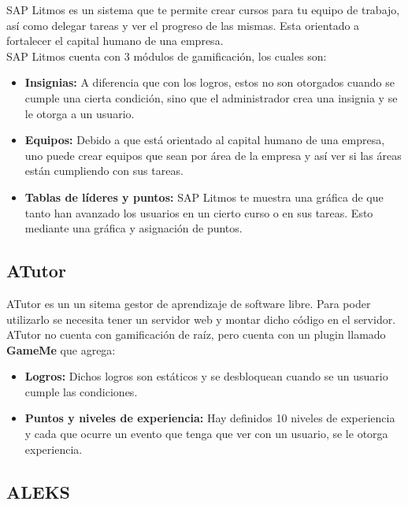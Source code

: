 \begin{multicols}{2}
    SAP Litmos es un sistema que te permite crear cursos para tu equipo de trabajo, así como delegar tareas y ver el progreso de las mismas. Esta orientado a fortalecer el capital humano de una empresa.\\
    
    \noindent SAP Litmos cuenta con 3 módulos de gamificación, los cuales son:
    \begin{itemize}
        \item \textbf{Insignias: } A diferencia que con los logros, estos no son otorgados cuando se cumple una cierta condición, sino que el administrador crea una insignia y se le otorga a un usuario.
        \item \textbf{Equipos: } Debido a que está orientado al capital humano de una empresa, uno puede crear equipos que sean por área de la empresa y así ver si las áreas están cumpliendo con sus tareas.
        \item \textbf{Tablas de líderes y puntos: } SAP Litmos te muestra una gráfica de que tanto han avanzado los usuarios en un cierto curso o en sus tareas. Esto mediante una gráfica y asignación de puntos.
    \end{itemize}

\subsection*{ATutor}

    ATutor es un un sitema gestor de aprendizaje de software libre. Para poder utilizarlo se necesita tener un servidor web y montar dicho código en el servidor.\\
    
    \noindent ATutor no cuenta con gamificación de raíz, pero cuenta con un plugin llamado \textbf{GameMe} que agrega:
    \begin{itemize}
        \item \textbf{Logros: } Dichos logros son estáticos y se desbloquean cuando se un usuario cumple las condiciones.
        \item \textbf{Puntos y niveles de experiencia: } Hay definidos 10 niveles de experiencia y cada que ocurre un evento que tenga que ver con un usuario, se le otorga experiencia.
    \end{itemize}

\subsection*{ALEKS}


\end{multicols}
